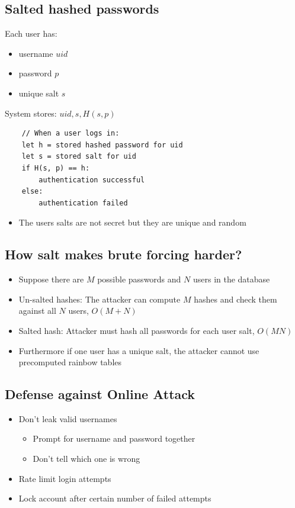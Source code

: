 \documentclass[12pt,a4paper]{article}
\begin{document}
\subsection{Salted hashed passwords}
Each user has:
\begin{itemize}
    \item username $uid$
    \item password $p$
    \item unique salt $s$ 
\end{itemize}
\noindent System stores: $uid, s, H(s, p)$
\begin{verbatim}
    // When a user logs in:
    let h = stored hashed password for uid
    let s = stored salt for uid
    if H(s, p) == h:
        authentication successful
    else:
        authentication failed
\end{verbatim}
\begin{itemize}
    \item The users salts are not secret but they are unique and random
\end{itemize}

\subsection{How salt makes brute forcing harder?}
\begin{itemize}
    \item Suppose there are $M$ possible passwords and $N$ users in the database
    \item Un-salted hashes: The attacker can compute $M$ hashes and check them against all $N$ users, $O(M+N)$
    \item Salted hash: Attacker must hash all passwords for each user salt, $O(MN)$
    \item Furthermore if one user has a unique salt, the attacker cannot use precomputed rainbow tables
\end{itemize}

\subsection{Defense against Online Attack}
\begin{itemize}
    \item Don't leak valid usernames
    \begin{itemize}
        \item Prompt for username and password together
        \item Don't tell which one is wrong
    \end{itemize}
    \item Rate limit login attempts
    \item Lock account after certain number of failed attempts
\end{itemize}
\end{document}
